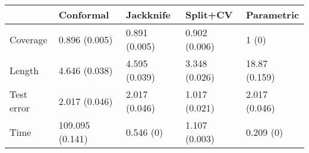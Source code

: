 \begin{tabular}{|l|l|l|l|l|}
\hline
& Conformal & Jackknife & Split+CV & Parametric \\
\hline
Coverage & 0.896 (0.005) & 0.891 (0.005) & 0.902 (0.006) & 1 (0) \\
\hline
Length & 4.646 (0.038) & 4.595 (0.039) & 3.348 (0.026) & 18.87 (0.159) \\
\hline
Test error & 2.017 (0.046) & 2.017 (0.046) & 1.017 (0.021) & 2.017 (0.046) \\
\hline
Time & 109.095 (0.141) & 0.546 (0) & 1.107 (0.003) & 0.209 (0) \\
\hline
\end{tabular}
